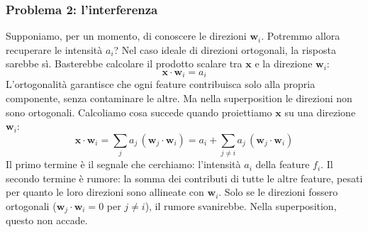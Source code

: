 \subsubsection{Problema 2: l'interferenza}
Supponiamo, per un momento, di conoscere le direzioni $\mathbf{w}_i$. Potremmo allora recuperare le intensità $a_i$?
Nel caso ideale di direzioni ortogonali, la risposta sarebbe sì. Basterebbe calcolare il prodotto scalare tra $\mathbf{x}$ e la direzione $\mathbf{w}_i$:
\begin{equation}
    \mathbf{x} \cdot \mathbf{w}_i = a_i
\end{equation}
L'ortogonalità garantisce che ogni feature contribuisca solo alla propria componente, senza contaminare le altre.
Ma nella superposition le direzioni non sono ortogonali. Calcoliamo cosa succede quando proiettiamo $\mathbf{x}$ su una direzione $\mathbf{w}_i$:
\begin{equation}
    \mathbf{x} \cdot \mathbf{w}_i = \sum_j a_j \, (\mathbf{w}_j \cdot \mathbf{w}_i) = a_i + \sum_{j \neq i} a_j \, (\mathbf{w}_j \cdot \mathbf{w}_i)
    \label{eq:interference}
\end{equation}
Il primo termine è il segnale che cerchiamo: l'intensità $a_i$ della feature $f_i$. Il secondo termine è rumore: la somma dei contributi di tutte le altre feature, pesati per quanto le loro direzioni sono allineate con $\mathbf{w}_i$.
Solo se le direzioni fossero ortogonali ($\mathbf{w}_j \cdot \mathbf{w}_i = 0$ per $j \neq i$), il rumore svanirebbe. Nella superposition, questo non accade.
